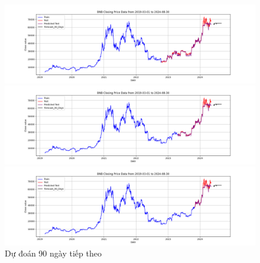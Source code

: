 \documentclass[conference]{IEEEtran}
\begin{document}
	\begin{figure}[H]
		\centering
		\begin{minipage}{0.15\textwidth}
			\centering
			\includegraphics[width=1\textwidth]{Figure/RandomForest_BTC_90days_73.png}
		\end{minipage}
		\hfill
		\begin{minipage}{0.15\textwidth}
			\centering
			\includegraphics[width=1\textwidth]{Figure/RandomForest_BTC_90days_82.png}
		\end{minipage}
		\hfill
		\begin{minipage}{0.15\textwidth}
			\centering
			\includegraphics[width=1\textwidth]{Figure/RandomForest_BTC_90days_91.png}
		\end{minipage}
		\caption{Dự đoán 90 ngày tiếp theo}
		\label{fig:1}
	\end{figure}
	
\end{document}
